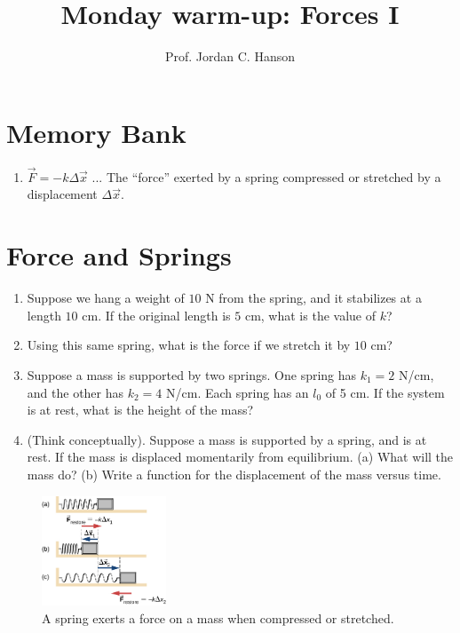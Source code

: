 \documentclass{article}
\begin{document}
\twocolumn

\title{Monday warm-up: Forces I}
\author{Prof. Jordan C. Hanson}

\maketitle

\section{Memory Bank}

\begin{enumerate}
\item $\vec{F} = - k \Delta \vec{x}$ ... The ``force'' exerted by a spring compressed or stretched by a displacement $\Delta \vec{x}$.
\end{enumerate}

\section{Force and Springs}

\begin{enumerate}
\item Suppose we hang a weight of $10$ N from the spring, and it stabilizes at a length $10$ cm.  If the original length is $5$ cm, what is the value of $k$? \\ \vspace{3cm}
\item Using this same spring, what is the force if we stretch it by $10$ cm? \\ \vspace{3cm}
\item Suppose a mass is supported by two springs.  One spring has $k_1 = 2$ N/cm, and the other has $k_2 = 4$ N/cm.  Each spring has an $l_0$ of 5 cm.  If the system is at rest, what is the height of the mass? \\ \vspace{3cm}
\item (Think conceptually).  Suppose a mass is supported by a spring, and is at rest.  If the mass is displaced momentarily from equilibrium.  (a) What will the mass do?  (b) Write a function for the displacement of the mass versus time. \\ \vspace{3cm}
\end{enumerate}

\begin{figure}[ht]
\centering
\includegraphics[width=0.33\textwidth]{figures/spring.jpeg}
\caption{\label{fig:1} A spring exerts a force on a mass when compressed or stretched.}
\end{figure}
\end{document}
